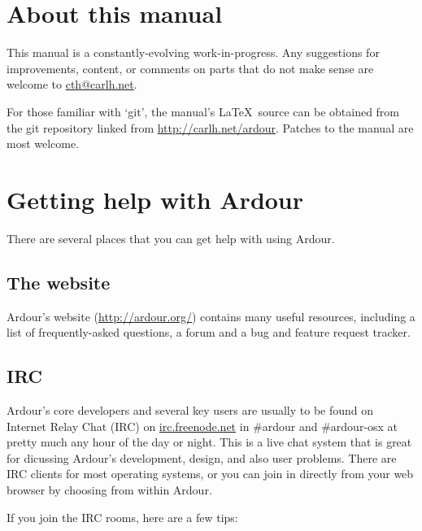\documentclass[10pt,a4paper]{book}
\newcommand{\menu}[1]{\emph{\StrSubstitute{#1}{,}{ $\rightarrow$ }}}
\begin{document}
\section{About this manual}

This manual is a constantly-evolving work-in-progress.  Any
suggestions for improvements, content, or comments on parts that do
not make sense are welcome to \url{cth@carlh.net}.  

\begin{danger}
For those familiar with `git', the manual's \LaTeX\ source can be
obtained from the git repository linked from
\url{http://carlh.net/ardour}.  Patches to the manual are most welcome.
\end{danger}


\section{Getting help with Ardour}

There are several places that you can get help with using Ardour.

\subsection{The website}

Ardour's website (\url{http://ardour.org/}) contains many useful
resources, including a list of frequently-asked questions, a forum and
a bug and feature request tracker.

\subsection{IRC}

Ardour's core developers and several key users are usually to be found
on Internet Relay Chat (IRC) on \url{irc.freenode.net} in \#ardour and
\#ardour-osx at pretty much any hour of the day or night.  This is a
live chat system that is great for dicussing Ardour's development,
design, and also user problems.  There are IRC clients for most
operating systems, or you can join in directly from your web browser
by choosing \menu{Help,Chat} from within Ardour.

If you join the IRC rooms, here are a few tips:
\end{document}
